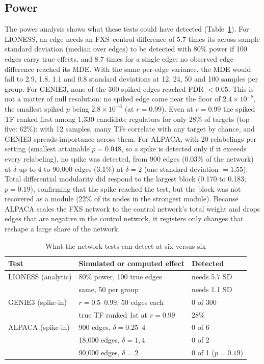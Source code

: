 \documentclass[journal]{IEEEtran}
\begin{document}
\subsection{Power}
The power analysis shows what these tests could have detected (Table~\ref{tab:power}). For LIONESS, an edge needs an FXS--control difference of 5.7 times its across-sample standard deviation (median over edges) to be detected with 80\% power if 100 edges carry true effects, and 8.7 times for a single edge; no observed edge difference reached its MDE. With the same per-edge variance, the MDE would fall to 2.9, 1.8, 1.1 and 0.8 standard deviations at 12, 24, 50 and 100 samples per group. For GENIE3, none of the 300 spiked edges reached FDR $<0.05$. This is not a matter of null resolution: no spiked edge came near the floor of $2.4\times10^{-8}$, the smallest spiked $p$ being $2.8\times10^{-6}$ (at $r=0.99$). Even at $r=0.99$ the spiked TF ranked first among 1,330 candidate regulators for only 28\% of targets (top five: 62\%): with 12 samples, many TFs correlate with any target by chance, and GENIE3 spreads importance across them. For ALPACA, with 20 relabelings per setting (smallest attainable $p=0.048$, so a spike is detected only if it exceeds every relabeling), no spike was detected, from 900 edges (0.03\% of the network) at $\delta$ up to 4 to 90,000 edges (3.1\%) at $\delta=2$ (one standard deviation $=1.55$). Total differential modularity did respond to the largest block (0.170 to 0.183; $p=0.19$), confirming that the spike reached the test, but the block was not recovered as a module (22\% of its nodes in the strongest module). Because ALPACA scales the FXS network to the control network's total weight and drops edges that are negative in the control network, it registers only changes that reshape a large share of the network.

\begin{table}[!t]
\centering
\caption{What the network tests can detect at six versus six}
\label{tab:power}
\footnotesize
\setlength{\tabcolsep}{3pt}
\begin{tabular}{@{}lll@{}}
\toprule
Test & Simulated or computed effect & Detected\\
\midrule
LIONESS (analytic) & 80\% power, 100 true edges & needs 5.7 SD\\
 & same, 50 per group & needs 1.1 SD\\
GENIE3 (spike-in) & $r=0.5$--$0.99$, 50 edges each & 0 of 300\\
 & true TF ranked 1st at $r=0.99$ & 28\%\\
ALPACA (spike-in) & 900 edges, $\delta=0.25$--4 & 0 of 6\\
 & 18,000 edges, $\delta=1, 4$ & 0 of 2\\
 & 90,000 edges, $\delta=2$ & 0 of 1 ($p=0.19$)\\
\bottomrule
\end{tabular}
\end{table}
\end{document}
